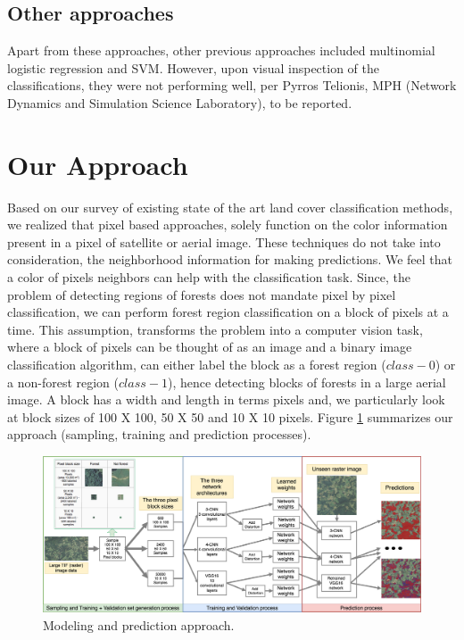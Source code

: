 \documentclass{sigkddExp}
\begin{document}
\subsection{Other approaches}

Apart from these approaches, other previous approaches included multinomial logistic regression and SVM.
However, upon visual inspection of the classifications,
they were not performing well, per Pyrros Telionis, MPH (Network Dynamics and Simulation Science Laboratory),
to be reported.

\section{Our Approach}
Based on our survey of existing state of the art land cover classification methods, we realized that pixel based approaches, solely function on the color information present in a pixel of satellite or aerial image. These techniques do not take into consideration, the neighborhood information for making predictions. We feel that a color of pixels neighbors can help with the classification task. Since, the problem of detecting regions of forests does not mandate pixel by pixel classification, we can perform forest region classification on a block of pixels at a time. This assumption, transforms the problem into a computer vision task, where a block of pixels can be thought of as an image and a binary image classification algorithm, can either label the block as a forest region ($class-0$) or a non-forest region ($class-1$), hence detecting blocks of forests in a large aerial image. A block has a width and length in terms pixels and, we particularly look at block sizes of 100 X 100, 50 X 50 and 10 X 10 pixels. Figure \ref{fig:approach} summarizes our approach (sampling, training and prediction processes). 
\begin{figure}
\centering
  \includegraphics[width=\linewidth]{approach.png}
  \caption{Modeling and prediction approach.}
  \label{fig:approach}
\end{figure}
\end{document}
